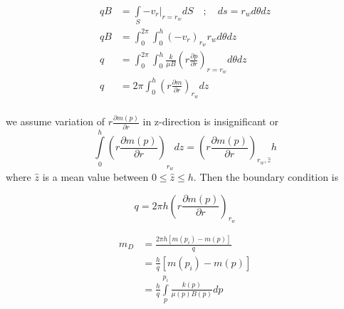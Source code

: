 \documentclass{llncs}
\numberwithin{equation}{section}
\numberwithin{figure}{section}
\numberwithin{table}{section}
\begin{document}
    \begin{equation*}
        \begin{split}
             qB&=\int\limits_{S}{-{{\left. {{v}_{r}} \right|}_{r={{r}_{w}}}}}dS\quad ;\quad ds={{r}_{w}}d\theta dz \\
             qB&=\int_{0}^{2\pi }{\int_{0}^{h}{{{\left( -{{v}_{r}} \right)}_{{{r}_{w}}}}{{r}_{w}}}}d\theta dz \\
             q&={{\int_{0}^{2\pi }{\int_{0}^{h}{\frac{k}{\mu B}\left( r\frac{\partial p}{\partial r} \right)}}}_{r={{r}_{w}}}}d\theta dz \\
             q&=2\pi {{\int_{0}^{h}{\left( r\frac{\partial m}{\partial r} \right)}}_{{{r}_{w}}}}dz \\
        \end{split}
    \end{equation*}    
    
     we assume  variation of $r\frac{\partial m\left( p \right)}{\partial r}$ in z-direction is insignificant or
    \begin{equation*}
    {{\int\limits_{0}^{h}{\left( r\frac{\partial m\left( p \right)}{\partial r} \right)}}_{{{r}_{w}}}}dz={{\left( r\frac{\partial m\left( p \right)}{\partial r} \right)}_{{{r}_{w}},\widehat{z}}}h
    \end{equation*}  
    where $\widehat{z}$ is a mean value between $0\leq \widehat{z} \leq h$. Then the boundary condition is
    
    
    \begin{equation}
        q=2\pi h{{\left( r\frac{\partial m\left( p \right)}{\partial r} \right)}_{{{r}_{w}}}}
        \label{Well_boundary}
    \end{equation}      
    
    \begin{equation}    
        \begin{split}
         {{m}_{D}}&=\frac{2\pi h\left[ m\left( {{p}_{i}} \right)-m\left( p \right) \right]}{q} \\
        & =\frac{h}{q}\left[ m\left( {{p}_{i}} \right)-m\left( p \right) \right] \\
        & =\frac{h}{q}\int\limits_{p}^{{{p}_{i}}}{\frac{k\left( p \right)}{\mu \left( p \right)B\left( p \right)}dp} \\
        \end{split}
        \label{mD_definition}
    \end{equation}      
       
\end{document}
